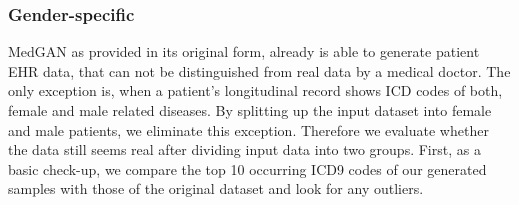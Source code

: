 \documentclass[11pt, a4paper]{book}
\begin{document}
\subsubsection{Gender-specific}
MedGAN as provided in its original form, already is able to generate patient EHR data, that can not be distinguished from real data by a medical doctor. The only exception is, when a patient's longitudinal record shows ICD codes of both, female and male related diseases.  \cite{Choi2017}
By splitting up the input dataset into female and male patients, we eliminate this exception. Therefore we evaluate whether the data still seems real after dividing input data into two groups.
First, as a basic check-up, we compare the top 10 occurring ICD9 codes of our generated samples with those of the original dataset and look for any outliers.
\end{document}
